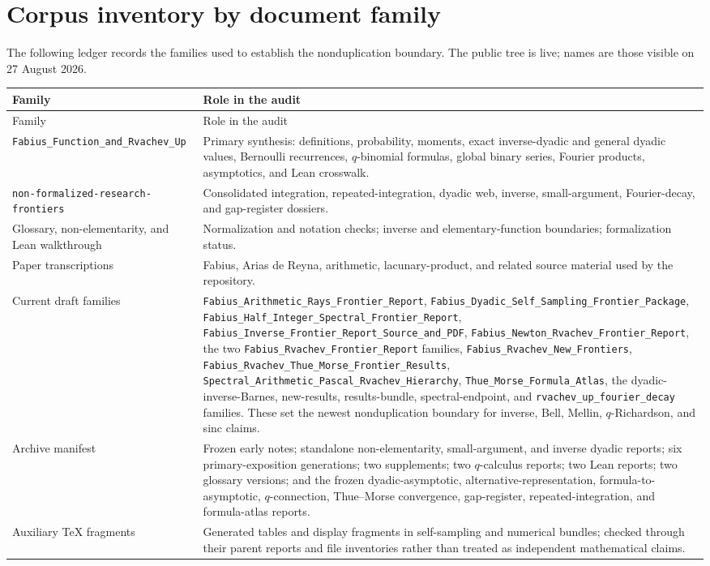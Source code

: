 \documentclass[11pt,oneside]{article}
\numberwithin{equation}{section}
\theoremstyle{definition}
\theoremstyle{remark}
\newcommand{\familyname}[1]{\nolinkurl{#1}}
\begin{document}
\section{Corpus inventory by document family}
\label{app:corpus}

The following ledger records the families used to establish the nonduplication
boundary.  The public tree is live; names are those visible on 27 August 2026.

\begingroup\small
\begin{longtable}{@{}>{\raggedright\arraybackslash}p{}>{\raggedright\arraybackslash}p{}@{}}
\toprule
Family & Role in the audit \\
\midrule
\endfirsthead
\toprule
Family & Role in the audit \\
\midrule
\endhead
\familyname{Fabius_Function_and_Rvachev_Up} &
Primary synthesis: definitions, probability, moments, exact inverse-dyadic and
general dyadic values, Bernoulli recurrences, $q$-binomial formulas, global
binary series, Fourier products, asymptotics, and Lean crosswalk. \\
\familyname{non-formalized-research-frontiers} &
Consolidated integration, repeated-integration, dyadic web, inverse,
small-argument, Fourier-decay, and gap-register dossiers. \\
Glossary, non-elementarity, and Lean walkthrough &
Normalization and notation checks; inverse and elementary-function boundaries;
formalization status. \\
Paper transcriptions &
Fabius, Arias de Reyna, arithmetic, lacunary-product, and related source
material used by the repository. \\
Current draft families &
\familyname{Fabius_Arithmetic_Rays_Frontier_Report},
\familyname{Fabius_Dyadic_Self_Sampling_Frontier_Package},
\familyname{Fabius_Half_Integer_Spectral_Frontier_Report},
\familyname{Fabius_Inverse_Frontier_Report_Source_and_PDF},
\familyname{Fabius_Newton_Rvachev_Frontier_Report}, the two
\familyname{Fabius_Rvachev_Frontier_Report} families,
\familyname{Fabius_Rvachev_New_Frontiers},
\familyname{Fabius_Rvachev_Thue_Morse_Frontier_Results},
\familyname{Spectral_Arithmetic_Pascal_Rvachev_Hierarchy},
\familyname{Thue_Morse_Formula_Atlas}, the dyadic-inverse-Barnes,
new-results, results-bundle, spectral-endpoint, and
\familyname{rvachev_up_fourier_decay} families.  These set the newest
nonduplication boundary for inverse, Bell, Mellin, $q$-Richardson, and sinc
claims. \\
Archive manifest &
Frozen early notes; standalone non-elementarity, small-argument, and inverse
dyadic reports; six primary-exposition generations; two supplements; two
$q$-calculus reports; two Lean reports; two glossary versions; and the frozen
dyadic-asymptotic, alternative-representation, formula-to-asymptotic,
$q$-connection, Thue--Morse convergence, gap-register, repeated-integration,
and formula-atlas reports. \\
Auxiliary TeX fragments &
Generated tables and display fragments in self-sampling and numerical bundles;
checked through their parent reports and file inventories rather than treated
as independent mathematical claims. \\
\bottomrule
\end{longtable}
\end{document}
